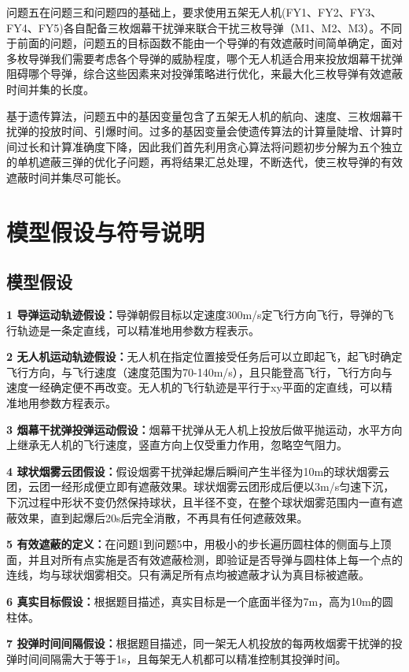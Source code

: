 \documentclass[withoutpreface,bwprint]{cumcmthesis} %
\begin{document}
问题五在问题三和问题四的基础上，要求使用五架无人机(FY1、FY2、FY3、FY4、FY5)各自配备三枚烟幕干扰弹来联合干扰三枚导弹（M1、M2、M3）。不同于前面的问题，问题五的目标函数不能由一个导弹的有效遮蔽时间简单确定，面对多枚导弹我们需要考虑各个导弹的威胁程度，哪个无人机适合用来投放烟幕干扰弹阻碍哪个导弹，综合这些因素来对投弹策略进行优化，来最大化三枚导弹有效遮蔽时间并集的长度。

基于遗传算法，问题五中的基因变量包含了五架无人机的航向、速度、三枚烟幕干扰弹的投放时间、引爆时间。过多的基因变量会使遗传算法的计算量陡增、计算时间过长和计算准确度下降，因此我们首先利用贪心算法将问题初步分解为五个独立的单机遮蔽三弹的优化子问题，再将结果汇总处理，不断迭代，使三枚导弹的有效遮蔽时间并集尽可能长。

\section{模型假设与符号说明}

\subsection{模型假设}

\textbf{1 导弹运动轨迹假设：}导弹朝假目标以定速度300m/s定飞行方向飞行，导弹的飞行轨迹是一条定直线，可以精准地用参数方程表示。

\textbf{2 无人机运动轨迹假设：}无人机在指定位置接受任务后可以立即起飞，起飞时确定飞行方向，与飞行速度（速度范围为70-140m/s），且只能登高飞行，飞行方向与速度一经确定便不再改变。无人机的飞行轨迹是平行于xy平面的定直线，可以精准地用参数方程表示。

\textbf{3 烟幕干扰弹投弹运动假设：}烟幕干扰弹从无人机上投放后做平抛运动，水平方向上继承无人机的飞行速度，竖直方向上仅受重力作用，忽略空气阻力。

\textbf{4 球状烟雾云团假设：}假设烟雾干扰弹起爆后瞬间产生半径为10m的球状烟雾云团，云团一经形成便立即有遮蔽效果。球状烟雾云团形成后便以3m/s匀速下沉，下沉过程中形状不变仍然保持球状，且半径不变，在整个球状烟雾范围内一直有遮蔽效果，直到起爆后20s后完全消散，不再具有任何遮蔽效果。

\textbf{5 有效遮蔽的定义：}在问题1到问题5中，用极小的步长遍历圆柱体的侧面与上顶面，并且对所有点实施是否有效遮蔽检测，即验证是否导弹与圆柱体上每一个点的连线，均与球状烟雾相交。只有满足所有点均被遮蔽才认为真目标被遮蔽。

\textbf{6 真实目标假设：}根据题目描述，真实目标是一个底面半径为7m，高为10m的圆柱体。

\textbf{7 投弹时间间隔假设：}根据题目描述，同一架无人机投放的每两枚烟雾干扰弹的投弹时间间隔需大于等于1s，且每架无人机都可以精准控制其投弹时间。
\end{document}

